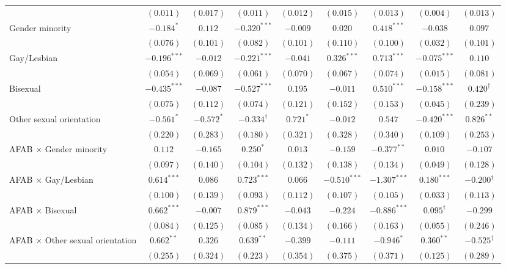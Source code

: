 \begin{table}[htpb]
{\begin{tabular}{l c c c c c c c c}
 & $(0.011)$ & $(0.017)$ & $(0.011)$ & $(0.012)$ & $(0.015)$ & $(0.013)$ & $(0.004)$ & $(0.013)$ \\
Gender minority & $-0.184^{*}$ & $0.112$ & $-0.320^{***}$ & $-0.009$ & $0.020$ & $0.418^{***}$ & $-0.038$ & $0.097$ \\
 & $(0.076)$ & $(0.101)$ & $(0.082)$ & $(0.101)$ & $(0.110)$ & $(0.100)$ & $(0.032)$ & $(0.101)$ \\
Gay/Lesbian & $-0.196^{***}$ & $-0.012$ & $-0.221^{***}$ & $-0.041$ & $0.326^{***}$ & $0.713^{***}$ & $-0.075^{***}$ & $0.110$ \\
 & $(0.054)$ & $(0.069)$ & $(0.061)$ & $(0.070)$ & $(0.067)$ & $(0.074)$ & $(0.015)$ & $(0.081)$ \\
Bisexual & $-0.435^{***}$ & $-0.087$ & $-0.527^{***}$ & $0.195$ & $-0.011$ & $0.510^{***}$ & $-0.158^{***}$ & $0.420^{\dagger}$ \\
 & $(0.075)$ & $(0.112)$ & $(0.074)$ & $(0.121)$ & $(0.152)$ & $(0.153)$ & $(0.045)$ & $(0.239)$ \\
Other sexual orientation & $-0.561^{*}$ & $-0.572^{*}$ & $-0.334^{\dagger}$ & $0.721^{*}$ & $-0.012$ & $0.547$ & $-0.420^{***}$ & $0.826^{**}$ \\
 & $(0.220)$ & $(0.283)$ & $(0.180)$ & $(0.321)$ & $(0.328)$ & $(0.340)$ & $(0.109)$ & $(0.253)$ \\
AFAB $\times$ Gender minority & $0.112$ & $-0.165$ & $0.250^{*}$ & $0.013$ & $-0.159$ & $-0.377^{**}$ & $0.010$ & $-0.107$ \\
 & $(0.097)$ & $(0.140)$ & $(0.104)$ & $(0.132)$ & $(0.138)$ & $(0.134)$ & $(0.049)$ & $(0.128)$ \\
AFAB $\times$ Gay/Lesbian & $0.614^{***}$ & $0.086$ & $0.723^{***}$ & $0.066$ & $-0.510^{***}$ & $-1.307^{***}$ & $0.180^{***}$ & $-0.200^{\dagger}$ \\
 & $(0.100)$ & $(0.139)$ & $(0.093)$ & $(0.112)$ & $(0.107)$ & $(0.105)$ & $(0.033)$ & $(0.113)$ \\
AFAB $\times$ Bisexual & $0.662^{***}$ & $-0.007$ & $0.879^{***}$ & $-0.043$ & $-0.224$ & $-0.886^{***}$ & $0.095^{\dagger}$ & $-0.299$ \\
 & $(0.084)$ & $(0.125)$ & $(0.085)$ & $(0.134)$ & $(0.166)$ & $(0.163)$ & $(0.055)$ & $(0.246)$ \\
AFAB $\times$ Other sexual orientation & $0.662^{**}$ & $0.326$ & $0.639^{**}$ & $-0.399$ & $-0.111$ & $-0.946^{*}$ & $0.360^{**}$ & $-0.525^{\dagger}$ \\
 & $(0.255)$ & $(0.324)$ & $(0.223)$ & $(0.354)$ & $(0.375)$ & $(0.371)$ & $(0.125)$ & $(0.289)$ \\

\end{tabular}}
\end{table}
